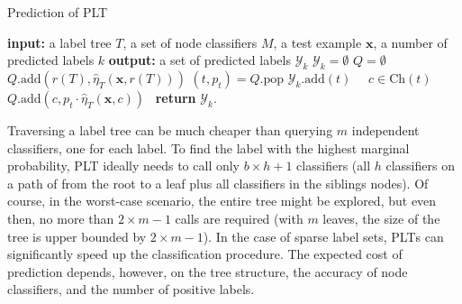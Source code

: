 \documentclass{article}
\newcommand{\Algo}[1]{\textsc{#1}}
\renewcommand{\vec}[1]{\boldsymbol{#1}}
\newcommand{\bx}{\vec{x}}
\newcommand{\by}{\vec{y}}
\newcommand{\calY}{\mathcal{Y}}
\newcommand{\heta}{\hat{\eta}}
\newcommand{\Children}[1]{\mathrm{Ch}(#1)}
\begin{document}

\begin{algorithm}[t]
\caption{Prediction of \Algo{PLT}} %
\label{alg:pt-prediction}
\begin{algorithmic}[1]
\State \textbf{input:} a label tree $T$,  a set of node classifiers $M$, a test example $\bx$, a number of predicted labels $k$ 
\State \textbf{output:} a set of predicted labels $\calY_k$ 
\State $\calY_k = \emptyset$
\State $Q = \emptyset$ 
\State $Q.\mathrm{add}(r(T),\heta_T(\bx,r(T)))$ 
\While{$|\calY_k| < k$}
\State $(t,p_t) = Q.\mathrm{pop}$
 $\calY_k.\mathrm{add}(t)$ 
\Else \ \algorithmicfor\ $c \in \Children{t}$\ \algorithmicdo\ $Q.\mathrm{add}(c, p_t \cdot \heta_T(\bx,c))$\ 
\EndIf
\EndWhile
\State \textbf{return} $\calY_k$. 
\end{algorithmic}
\end{algorithm} 

Traversing a label tree can be much cheaper than querying $m$ independent classifiers, one for each label. To find the label with the highest marginal probability, \Algo{PLT} ideally needs to call only $b\times h+1$ classifiers (all $h$ classifiers on a path of from the root to a leaf plus all classifiers in the siblings nodes). Of course, in the worst-case scenario, the entire tree might be explored, but even then, no more than $2 \times m-1$ calls are required (with $m$ leaves, the size of the tree is upper bounded by $2 \times m-1$). In the case of sparse label sets, \Algo{PLT}s can significantly speed up the classification procedure. The expected cost of prediction depends, however, on the tree structure, the accuracy of node classifiers, and the number of positive labels.
\end{document}
